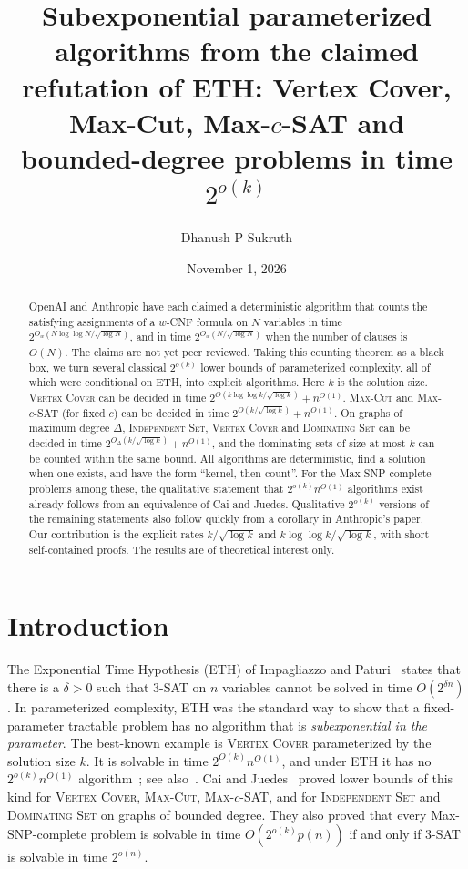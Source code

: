 \documentclass[11pt]{amsart}
\title[Subexponential parameterized algorithms after ETH]{Subexponential parameterized algorithms from the claimed refutation of ETH: Vertex Cover, Max-Cut, Max-$c$-SAT and bounded-degree problems in time $2^{o(k)}$}
\author{Dhanush P Sukruth}
\date{November 1, 2026}
\theoremstyle{definition}
\theoremstyle{remark}
\newcommand{\VC}{\textup{\textsc{Vertex Cover}}}
\newcommand{\MC}{\textup{\textsc{Max-Cut}}}
\newcommand{\MS}{\textup{\textsc{Max-$c$-SAT}}}
\newcommand{\IS}{\textup{\textsc{Independent Set}}}
\newcommand{\DS}{\textup{\textsc{Dominating Set}}}
\begin{document}
\begin{abstract}
OpenAI and Anthropic have each claimed a deterministic algorithm that counts the satisfying assignments of a $w$-CNF formula on $N$ variables in time $2^{O_w(N\log\log N/\sqrt{\log N})}$, and in time $2^{O_w(N/\sqrt{\log N})}$ when the number of clauses is $O(N)$. The claims are not yet peer reviewed. Taking this counting theorem as a black box, we turn several classical $2^{o(k)}$ lower bounds of parameterized complexity, all of which were conditional on ETH, into explicit algorithms. Here $k$ is the solution size. \VC{} can be decided in time $2^{O(k\log\log k/\sqrt{\log k})}+n^{O(1)}$. \MC{} and \MS{} (for fixed $c$) can be decided in time $2^{O(k/\sqrt{\log k})}+n^{O(1)}$. On graphs of maximum degree $\Delta$, \IS, \VC{} and \DS{} can be decided in time $2^{O_\Delta(k/\sqrt{\log k})}+n^{O(1)}$, and the dominating sets of size at most $k$ can be counted within the same bound. All algorithms are deterministic, find a solution when one exists, and have the form ``kernel, then count''. For the Max-SNP-complete problems among these, the qualitative statement that $2^{o(k)}n^{O(1)}$ algorithms exist already follows from an equivalence of Cai and Juedes. Qualitative $2^{o(k)}$ versions of the remaining statements also follow quickly from a corollary in Anthropic's paper. Our contribution is the explicit rates $k/\sqrt{\log k}$ and $k\log\log k/\sqrt{\log k}$, with short self-contained proofs. The results are of theoretical interest only.
\end{abstract}

\maketitle

\section{Introduction}

The Exponential Time Hypothesis (ETH) of Impagliazzo and Paturi~\cite{IP01} states that there is a $\delta>0$ such that 3-SAT on $n$ variables cannot be solved in time $O(2^{\delta n})$. In parameterized complexity, ETH was the standard way to show that a fixed-parameter tractable problem has no algorithm that is \emph{subexponential in the parameter}. The best-known example is \VC{} parameterized by the solution size $k$. It is solvable in time $2^{O(k)}n^{O(1)}$, and under ETH it has no $2^{o(k)}n^{O(1)}$ algorithm~\cite{CJ03}; see also~\cite[Chapter~14]{CFK15}. Cai and Juedes~\cite{CJ03} proved lower bounds of this kind for \VC, \MC, \MS, and for \IS{} and \DS{} on graphs of bounded degree. They also proved that every Max-SNP-complete problem is solvable in time $O(2^{o(k)}p(n))$ if and only if 3-SAT is solvable in time $2^{o(n)}$.
\end{document}
